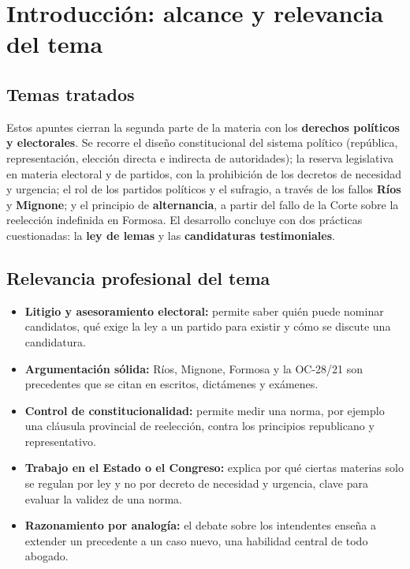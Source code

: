 \documentclass[12pt,oneside]{book}
\begin{document}
\chapter*{Introducción: alcance y relevancia del tema}

\section*{Temas tratados}

Estos apuntes cierran la segunda parte de la materia con los \textbf{derechos políticos y electorales}. Se recorre el diseño constitucional del sistema político (república, representación, elección directa e indirecta de autoridades); la reserva legislativa en materia electoral y de partidos, con la prohibición de los decretos de necesidad y urgencia; el rol de los partidos políticos y el sufragio, a través de los fallos \textbf{Ríos} y \textbf{Mignone}; y el principio de \textbf{alternancia}, a partir del fallo de la Corte sobre la reelección indefinida en Formosa. El desarrollo concluye con dos prácticas cuestionadas: la \textbf{ley de lemas} y las \textbf{candidaturas testimoniales}.

\section*{Relevancia profesional del tema}

\begin{itemize}
    \item \textbf{Litigio y asesoramiento electoral:} permite saber quién puede nominar candidatos, qué exige la ley a un partido para existir y cómo se discute una candidatura.
    \item \textbf{Argumentación sólida:} Ríos, Mignone, Formosa y la OC-28/21 son precedentes que se citan en escritos, dictámenes y exámenes.
    \item \textbf{Control de constitucionalidad:} permite medir una norma, por ejemplo una cláusula provincial de reelección, contra los principios republicano y representativo.
    \item \textbf{Trabajo en el Estado o el Congreso:} explica por qué ciertas materias solo se regulan por ley y no por decreto de necesidad y urgencia, clave para evaluar la validez de una norma.
    \item \textbf{Razonamiento por analogía:} el debate sobre los intendentes enseña a extender un precedente a un caso nuevo, una habilidad central de todo abogado.
\end{itemize}
\end{document}
